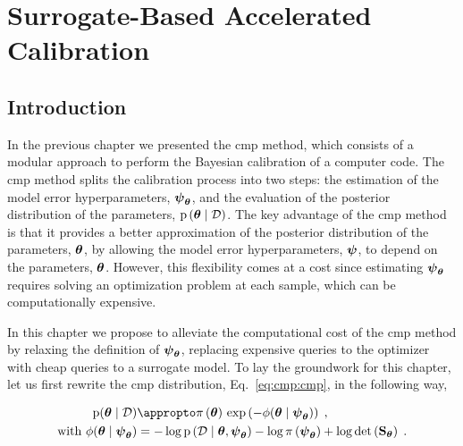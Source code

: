 %
\chapter{Surrogate-Based Accelerated Calibration}
\label{sec:surr}


\section{Introduction}
\label{sec:surr:intro}

In the previous chapter we presented the \gls{cmp} method, which consists of a modular approach to perform the Bayesian calibration of a computer code. The \gls{cmp} method splits the calibration process into two steps: the estimation of the model error hyperparameters, $\boldsymbol{\psi}_{\boldsymbol{\theta}}$, and the evaluation of the posterior distribution of the parameters, $\mathrm{p} \left( \boldsymbol{\theta} \mid \mathcal{D} \right)$. The key advantage of the \gls{cmp} method is that it provides a better approximation of the posterior distribution of the parameters, $\boldsymbol{\theta}$, by allowing the model error hyperparameters, $\boldsymbol{\psi}$, to depend on the parameters, $\boldsymbol{\theta}$. However, this flexibility comes at a cost since estimating $\boldsymbol{\psi}_{\boldsymbol{\theta}}$ requires solving an optimization problem at each sample, which can be computationally expensive. 

\smallskip
In this chapter we propose to alleviate the computational cost of the \gls{cmp} method by relaxing the definition of $\boldsymbol{\psi}_{\boldsymbol{\theta}}$, replacing expensive queries to the optimizer with cheap queries to a surrogate model. To lay the groundwork for this chapter, let us first rewrite the \gls{cmp} distribution, Eq.~\eqref{eq:cmp:cmp}, in the following way,

\begin{equation}
  \begin{aligned}
    \mathrm{p}(\btheta \mid \data) &\appropto \prior{\btheta} \, \exp\left(-\phi(\btheta \mid \psimap)\right)\;, \\
    \text{with } \phi(\btheta \mid \psimap) &= -\log \likelihood{\data \mid \btheta, \psimap} - \log \prior{\psimap} + \log \detf{\Stheta}\;.
  \end{aligned}
  \label{eq:surr:cmp}
\end{equation}

